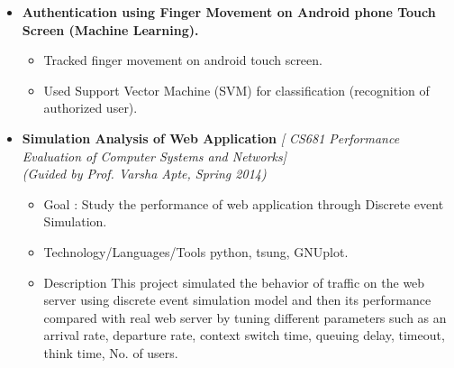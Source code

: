 \begin{itemize}
\item \textbf{Authentication using Finger Movement on Android phone Touch Screen (Machine Learning).}\hfill \\[-0.6cm]
\begin{itemize}
	\item Tracked finger movement on android touch screen.\\[-0.6cm]
	\item Used Support Vector Machine (SVM) for classification (recognition of authorized user).\\[-0.6cm]
\end{itemize}
\item \textbf{Simulation Analysis of Web Application } \emph{[ CS681 Performance Evaluation of Computer Systems and Networks]} \\
	\emph{(Guided by Prof. Varsha Apte, Spring 2014)} \hfill \\[-0.6cm]
	\begin{itemize}
	  \item Goal : Study the performance of web application through Discrete event Simulation. \\[-0.6cm]
	      \item Technology/Languages/Tools  python, tsung, GNUplot. \\[-0.6cm]
	      \item Description 
	      This project simulated the behavior of traffic on the web server using discrete event simulation model and
	      then its performance compared with real web server by tuning different parameters such as an arrival
	      rate, departure rate, context switch time, queuing delay, timeout, think time, No. of users. \\[-0.6cm]
	\end{itemize}
	

\end{itemize}
